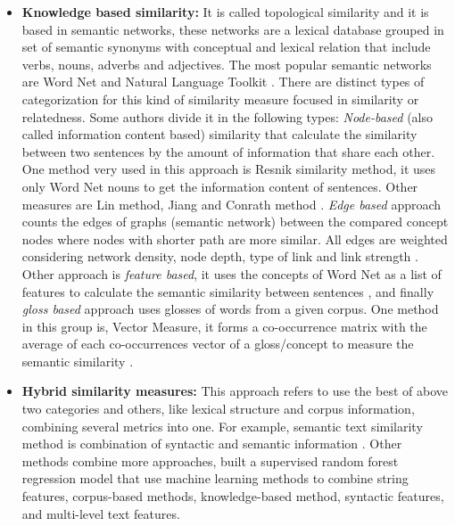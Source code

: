 \documentclass[12pt]{report}
\begin{document}
\begin{itemize}[nolistsep]
	\item \textbf{Knowledge based similarity:} It is called topological similarity and it is based in semantic networks, these networks are a lexical database grouped in set of semantic synonyms with conceptual and lexical relation that include verbs, nouns, adverbs and adjectives. The most popular semantic networks are Word Net and Natural Language Toolkit \cite{Gomaa2013} \cite{Pradhan2015} \cite{Majumder2016}. There are distinct types of categorization for this kind of similarity measure focused in similarity or relatedness. Some authors divide it in the following types: \textit{Node-based} (also called information content based) similarity that calculate the similarity between two sentences by the amount of information that share each other. One method very used in this approach is Resnik similarity method, it uses only Word Net nouns to get the information content of sentences. Other measures are Lin method, Jiang and Conrath method \cite{Majumder2016} \cite{Zhang2015} \cite{Pradhan2015}. \textit{Edge based} approach counts the edges of graphs (semantic network) between the compared concept nodes where nodes with shorter path are more similar. All edges are weighted considering network density, node depth, type of link and link strength \cite{Majumder2016}  \cite{Zhang2015}. Other approach is \textit{feature based}, it uses the concepts of Word Net as a list of features to calculate the semantic similarity between sentences \cite{Zhang2015}, and finally \textit{gloss based} approach uses glosses of words from a given corpus. One method in this group is, Vector Measure, it forms a co-occurrence matrix with the average of each co-occurrences vector of a gloss/concept to measure the semantic similarity \cite{Pradhan2015}  \cite{Zhang2015}.
	
	\item \textbf{Hybrid similarity measures:} This approach refers to use the best of above two categories and others, like lexical structure and corpus information, combining several metrics into one. For example, semantic text similarity method is combination of syntactic and semantic information \cite{Zhang2015} \cite{Gomaa2013}. Other methods combine more approaches, \cite{Zhu2014} built a supervised random forest regression model that use machine learning methods to combine string features, corpus-based methods, knowledge-based method, syntactic features, 
	and
	multi-level text features.
	
\end{itemize}
\end{document}
